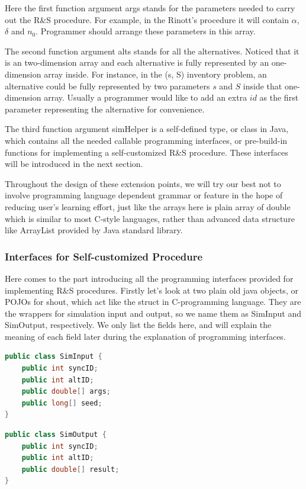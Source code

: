 \documentclass[12pt,a4paper]{report}
\begin{document}
Here the first function argument args stands for the parameters needed to carry out the R\&S procedure. For example, in the Rinott's procedure it will contain $\alpha$, $\delta$ and $n_0$. Programmer should arrange these parameters in this array.

The second function argument alts stands for all the alternatives. Noticed that it is an two-dimension array and each alternative is fully represented by an one-dimension array inside. For instance, in the (s, S) inventory problem, an alternative could be fully represented by two parameters $s$ and $S$ inside that one-dimension array. Usually a programmer would like to add an extra $id$ as the first parameter representing the alternative for convenience.

The third function argument simHelper is a self-defined type, or class in Java, which contains all the needed callable programming interfaces, or pre-build-in functions for implementing a self-customized R\&S procedure. These interfaces will be introduced in the next section.

Throughout the design of these extension points, we will try our best not to involve programming language dependent grammar or feature in the hope of reducing user's learning effort, just like the arrays here is plain array of double which is similar to most C-style languages, rather than advanced data structure like ArrayList provided by Java standard library.

\subsubsection{Interfaces for Self-customized Procedure}

Here comes to the part introducing all the programming interfaces provided for implementing R\&S procedures. Firstly let's look at two plain old java objects, or POJOs for shout, which act like the struct in C-programming language. They are the wrappers for simulation input and output, so we name them as SimInput and SimOutput, respectively. We only list the fields here, and will explain the meaning of each field later during the explanation of programming interfaces.

\begin{lstlisting}[language=Java]
public class SimInput {
	public int syncID;
	public int altID;
	public double[] args;
	public long[] seed;
}
\end{lstlisting}

\begin{lstlisting}[language=Java]
public class SimOutput {
	public int syncID;
	public int altID;
	public double[] result;
}
\end{lstlisting}
\end{document}
